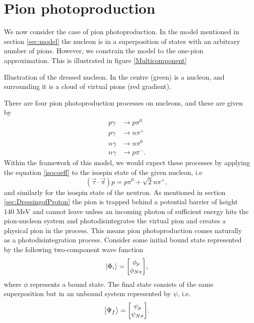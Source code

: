 \chapter{Pion photoproduction}\label{sec:PionPhotoproduction}
We now consider the case of pion photoproduction. In the model mentioned in section \ref{sec:model} the nucleon is in a superposition of states with an arbitrary number of pions. However, we constrain the model to the one-pion approximation. This is illustrated in figure \ref{Multicomponent}
\begin{marginfigure}
	\centering
	
	\caption{Illustration of the dressed nucleon. In the centre (green) is a nucleon, and surrounding it is a cloud of virtual pions (red gradient). }
	\label{Multicomponent}
\end{marginfigure}
There are four pion photoproduction processes on nucleons, and these are given by
\begin{align}
	p \gamma & \rightarrow p \pi^0 \label{photonew1}\\
	p \gamma & \rightarrow n \pi^+ \label{photonew2}\\
	n \gamma & \rightarrow n \pi^0 \label{photonew3}\\
	n \gamma & \rightarrow p \pi^- \label{photonew4}.
\end{align}
Within the framework of this model, we would expect these processes by applying the equation \eqref{isocoeff} to the isospin state of the given nucleon, i.e
\begin{equation} \label{isovectorex}
	(\vec{\tau}\cdot\vec{\pi}) p = p\pi^0 + \sqrt{2}n\pi^+,
\end{equation}
and similarly for the isospin state of the neutron. As mentioned in section \ref{sec:DressingofProton} the pion is trapped behind a potential barrier of height $140$ MeV and cannot leave unless an incoming photon of sufficient energy hits the pion-nucleon system and photodisintegrates the virtual pion and creates a physical pion in the process. This means pion photoproduction comes naturally as a photodisintegration process. Consider some initial bound state represented by the following two-component wave function
\begin{equation} \label{phii}
	\ket{\Phi_i} = \mqty[\phi_p \\ \phi_{N\pi}],
\end{equation}
where $\phi$ represents a bound state. The final state consists of the same superposition but in an unbound system represented by $\psi$, i.e.
\begin{equation} \label{psif}
	\ket{\Psi_f} = \mqty[\psi_p \\ \psi_{N\pi}].
\end{equation}
